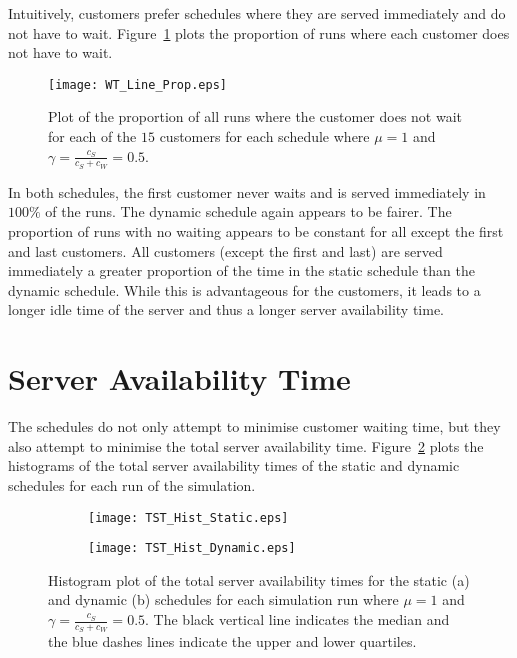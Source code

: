 Intuitively, customers prefer schedules where they are served immediately and do not have to wait. Figure~\ref{fig:No_Wait_Position} plots the proportion of runs where each customer does not have to wait.
\begin{figure}[htb]
	\centering
	\texttt{[image: WT\_Line\_Prop.eps]}
	\caption{Plot of the proportion of all runs where the customer does not wait for each of the $15$ customers for each schedule where $\mu = 1$ and $\gamma = \frac{c_{S}}{c_{S} + c_{W}} = 0.5$.}
	\label{fig:No_Wait_Position}
\end{figure}

In both schedules, the first customer never waits and is served immediately in $100 \%$ of the runs. The dynamic schedule again appears to be fairer. The proportion of runs with no waiting appears to be constant for all except the first and last customers. All customers (except the first and last) are served immediately a greater proportion of the time in the static schedule than the dynamic schedule. While this is advantageous for the customers, it leads to a longer idle time of the server and thus a longer server availability time.

\section{Server Availability Time}
The schedules do not only attempt to minimise customer waiting time, but they also attempt to minimise the total server availability time. Figure~\ref{fig:Two_Server} plots the histograms of the total server availability times of the static and dynamic schedules for each run of the simulation.
\begin{figure}[htb]
	\centering
	\begin{subfigure}[t]{0.45\textwidth}
		\centering
		\texttt{[image: TST\_Hist\_Static.eps]}
		\caption{}
	\end{subfigure}
	\begin{subfigure}[t]{0.45\textwidth}
		\centering
		\texttt{[image: TST\_Hist\_Dynamic.eps]}
		\caption{}
	\end{subfigure}
	\caption{Histogram plot of the total server availability times for the static (a) and dynamic (b) schedules for each simulation run where $\mu = 1$ and $\gamma = \frac{c_{S}}{c_{S} + c_{W}} = 0.5$. The black vertical line indicates the median and the blue dashes lines indicate the upper and lower quartiles.}
	\label{fig:Two_Server}
\end{figure}

